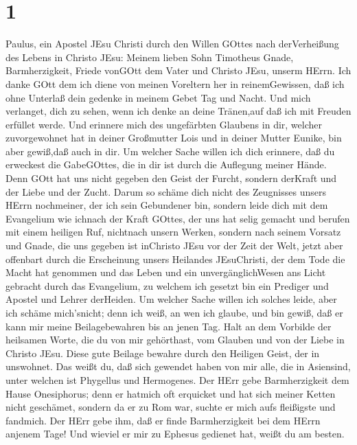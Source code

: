 \hypertarget{section}{%
\section{1}\label{section}}

 Paulus, ein Apostel JEsu Christi durch den Willen GOttes
nach derVerheißung des Lebens in Christo JEsu:  Meinem
lieben Sohn Timotheus Gnade, Barmherzigkeit, Friede vonGOtt dem Vater
und Christo JEsu, unserm HErrn.  Ich danke GOtt dem ich
diene von meinen Voreltern her in reinemGewissen, daß ich ohne Unterlaß
dein gedenke in meinem Gebet Tag und Nacht.  Und mich
verlanget, dich zu sehen, wenn ich denke an deine Tränen,auf daß ich mit
Freuden erfüllet werde.  Und erinnere mich des ungefärbten
Glaubens in dir, welcher zuvorgewohnet hat in deiner Großmutter Lois und
in deiner Mutter Eunike, bin aber gewiß,daß auch in dir.  Um
welcher Sache willen ich dich erinnere, daß du erweckest die GabeGOttes,
die in dir ist durch die Auflegung meiner Hände.  Denn GOtt
hat uns nicht gegeben den Geist der Furcht, sondern derKraft und der
Liebe und der Zucht.  Darum so schäme dich nicht des
Zeugnisses unsers HErrn nochmeiner, der ich sein Gebundener bin, sondern
leide dich mit dem Evangelium wie ichnach der Kraft GOttes, 
der uns hat selig gemacht und berufen mit einem heiligen Ruf, nichtnach
unsern Werken, sondern nach seinem Vorsatz und Gnade, die uns gegeben
ist inChristo JEsu vor der Zeit der Welt,  jetzt aber
offenbart durch die Erscheinung unsers Heilandes JEsuChristi, der dem
Tode die Macht hat genommen und das Leben und ein unvergänglichWesen ans
Licht gebracht durch das Evangelium,  zu welchem ich
gesetzt bin ein Prediger und Apostel und Lehrer derHeiden. 
Um welcher Sache willen ich solches leide, aber ich schäme mich'snicht;
denn ich weiß, an wen ich glaube, und bin gewiß, daß er kann mir meine
Beilagebewahren bis an jenen Tag.  Halt an dem Vorbilde der
heilsamen Worte, die du von mir gehörthast, vom Glauben und von der
Liebe in Christo JEsu.  Diese gute Beilage bewahre durch
den Heiligen Geist, der in unswohnet.  Das weißt du, daß
sich gewendet haben von mir alle, die in Asiensind, unter welchen ist
Phygellus und Hermogenes.  Der HErr gebe Barmherzigkeit dem
Hause Onesiphorus; denn er hatmich oft erquicket und hat sich meiner
Ketten nicht geschämet,  sondern da er zu Rom war, suchte
er mich aufs fleißigste und fandmich.  Der HErr gebe ihm,
daß er finde Barmherzigkeit bei dem HErrn anjenem Tage! Und wieviel er
mir zu Ephesus gedienet hat, weißt du am besten.

